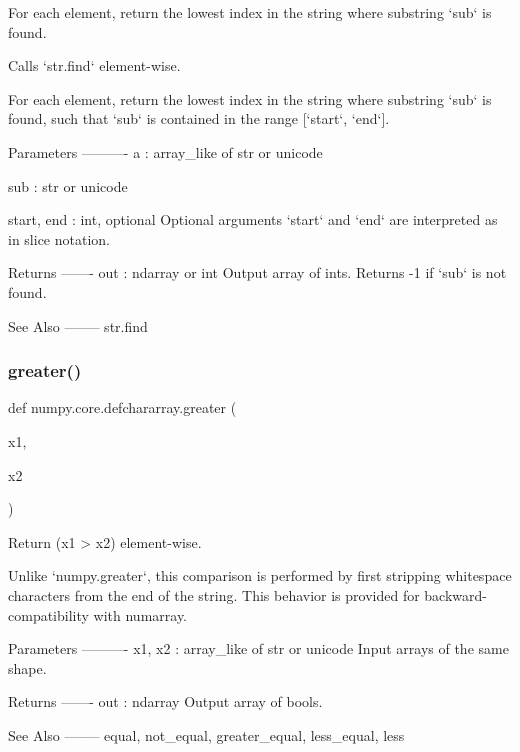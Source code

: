 \begin{DoxyVerb}For each element, return the lowest index in the string where
substring `sub` is found.

Calls `str.find` element-wise.

For each element, return the lowest index in the string where
substring `sub` is found, such that `sub` is contained in the
range [`start`, `end`].

Parameters
----------
a : array_like of str or unicode

sub : str or unicode

start, end : int, optional
    Optional arguments `start` and `end` are interpreted as in
    slice notation.

Returns
-------
out : ndarray or int
    Output array of ints.  Returns -1 if `sub` is not found.

See Also
--------
str.find\end{DoxyVerb}
 \mbox{\label{namespacenumpy_1_1core_1_1defchararray_a2f08b69cc500e2d159b8ed84f357c704}} 
\subsubsection{\texorpdfstring{greater()}{greater()}}
{\footnotesize\ttfamily def numpy.\+core.\+defchararray.\+greater (\begin{DoxyParamCaption}\item[{}]{x1,  }\item[{}]{x2 }\end{DoxyParamCaption})}

\begin{DoxyVerb}Return (x1 > x2) element-wise.

Unlike `numpy.greater`, this comparison is performed by first
stripping whitespace characters from the end of the string.  This
behavior is provided for backward-compatibility with numarray.

Parameters
----------
x1, x2 : array_like of str or unicode
    Input arrays of the same shape.

Returns
-------
out : ndarray
    Output array of bools.

See Also
--------
equal, not_equal, greater_equal, less_equal, less
\end{DoxyVerb}
 \mbox{\label{namespacenumpy_1_1core_1_1defchararray_a80726c4ec5ca4d879c2561c92857dbc6}} 

